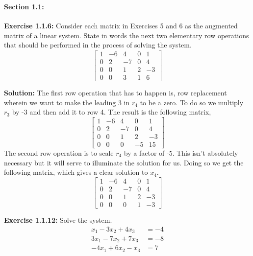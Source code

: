 \documentclass{amsart}
\begin{document}
\thispagestyle{fancy}


{\huge\textbf{Section 1.1:}}\\\\
\noindent\textbf{Exercise 1.1.6: }Consider each matrix in Exercises 5 and 6 as the augmented matrix
of a linear system. State in words the next two elementary row operations that should be performed in the process of solving the system.
\begin{equation}
\begin{bmatrix} 
1&-6&4&0&1\\
0&2&-7&0&4\\
0&0&1&2&-3\\
0&0&3&1&6
\end{bmatrix}
\end{equation}
 
\noindent \textbf{Solution: }
The first row operation that has to happen is, row replacement wherein we want to make the leading 3 in $r_4$ to be a zero. To do so we multiply  $r_3$ by -3 and then add it to row 4. The result is the following matrix,
\begin{equation}
\begin{bmatrix} 
1&-6&4&0&1\\
0&2&-7&0&4\\
0&0&1&2&-3\\
0&0&0&-5&15
\end{bmatrix}
\end{equation}
 The second row operation is to scale $r_4$ by a factor of -5. This isn't absolutely necessary but it will serve to illuminate the solution for us. Doing so we get the following matrix, which gives a clear solution to $x_4$.
\begin{equation}
\begin{bmatrix} 
1&-6&4&0&1\\
0&2&-7&0&4\\
0&0&1&2&-3\\
0&0&0&1&-3
\end{bmatrix}
\end{equation}








\vspace{1in}







\noindent\textbf{Exercise 1.1.12: }Solve the system.
\begin{align}
x_{1}-3x_{2}+4x_{3}&=-4\\
3x_{1}-7x_{2}+7x_{3}&=-8\\
-4x_{1}+6x_{2}-x_{3}&=7
\end{align}
\end{document}
